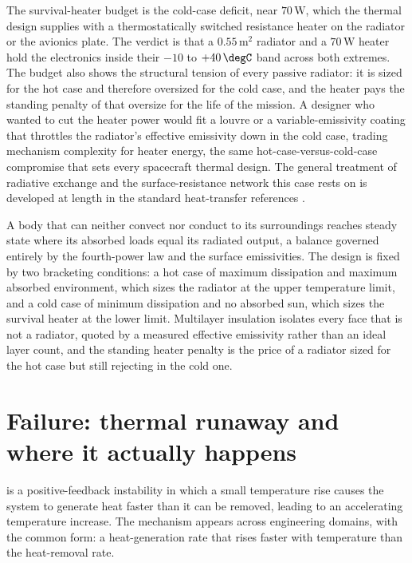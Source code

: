 The survival-heater budget is the cold-case deficit, near $70\,\text{W}$,
which the thermal design supplies with a thermostatically switched
resistance heater on the radiator or the avionics plate. The verdict is
that a $0.55\,\text{m}^2$ radiator and a $70\,\text{W}$ heater hold the
electronics inside their $-10$ to $+40\,\degC$ band across both extremes.
The budget also shows the structural tension of every passive radiator: it
is sized for the hot case and therefore oversized for the cold case, and
the heater pays the standing penalty of that oversize for the life of the
mission. A designer who wanted to cut the heater power would fit a
louvre or a variable-emissivity coating that throttles the radiator's
effective emissivity down in the cold case, trading mechanism complexity
for heater energy, the same hot-case-versus-cold-case compromise that sets
every spacecraft thermal design. The general treatment of radiative
exchange and the surface-resistance network this case rests on is
developed at length in the standard heat-transfer references
\cite{text:incropera2007}.

\begin{principle}
A body that can neither convect nor conduct to its surroundings reaches
steady state where its absorbed loads equal its radiated output, a
balance governed entirely by the fourth-power law and the surface
emissivities. The design is fixed by two bracketing conditions: a hot
case of maximum dissipation and maximum absorbed environment, which sizes
the radiator at the upper temperature limit, and a cold case of minimum
dissipation and no absorbed sun, which sizes the survival heater at the
lower limit. Multilayer insulation isolates every face that is not a
radiator, quoted by a measured effective emissivity rather than an ideal
layer count, and the standing heater penalty is the price of a radiator
sized for the hot case but still rejecting in the cold one.
\end{principle}

\section{Failure: thermal runaway and where it actually happens}

 is a positive-feedback instability in which
a small temperature rise causes the system to generate heat faster
than it can be removed, leading to an accelerating temperature
increase. The mechanism appears across engineering domains, with the
common form: a heat-generation rate that rises faster with temperature
than the heat-removal rate.


